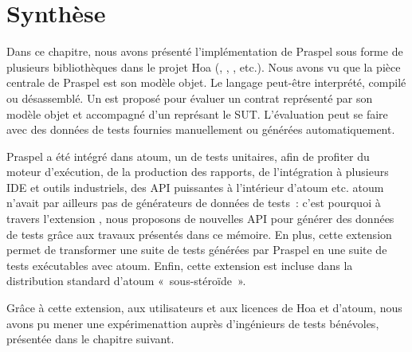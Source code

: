 \section{Synthèse}
\label{section:tools:summary}

Dans ce chapitre, nous avons présenté l'implémentation de Praspel sous forme de
plusieurs bibliothèques dans le projet Hoa (,
, ,
 etc.). Nous avons vu que la pièce centrale de Praspel
est son modèle objet. Le langage peut-être interprété, compilé ou désassemblé.
Un  est proposé pour évaluer un contrat
représenté par son modèle objet et accompagné d'un 
représant le SUT. L'évaluation peut se faire avec des données de tests fournies
manuellement ou générées automatiquement.

Praspel a été intégré dans atoum, un  de tests unitaires,
afin de profiter du moteur d'exécution, de la production des rapports, de
l'intégration à plusieurs IDE et outils industriels, des API puissantes à
l'intérieur d'atoum etc. atoum n'avait par ailleurs pas de générateurs de
données de tests~: c'est pourquoi à travers l'extension
, nous proposons de nouvelles API pour
générer des données de tests grâce aux travaux présentés dans ce mémoire. En
plus, cette extension permet de transformer une suite de tests générées par
Praspel en une suite de tests exécutables avec atoum. Enfin, cette extension est
incluse dans la distribution standard d'atoum «~sous-stéroïde~».

Grâce à cette extension, aux utilisateurs et aux licences
 de Hoa et d'atoum, nous avons pu mener une
expérimenattion auprès d'ingénieurs de tests bénévoles, présentée dans le
chapitre suivant.

